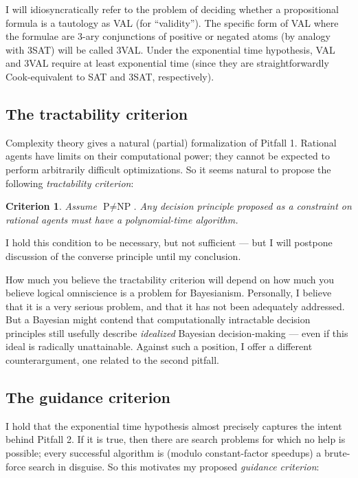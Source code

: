 \documentclass[letterpaper,12pt]{article}
\newtheorem{tractability}{Criterion}[section]
\begin{document}
I will idiosyncratically refer to the problem of deciding whether a propositional formula is a tautology as VAL (for ``validity''). The specific form of VAL where the formulae are 3-ary conjunctions of positive or negated atoms (by analogy with 3SAT) will be called 3VAL. Under the exponential time hypothesis, VAL and 3VAL require at least exponential time (since they are straightforwardly Cook-equivalent to SAT and 3SAT, respectively).

\subsection{The tractability criterion}
Complexity theory gives a natural (partial) formalization of Pitfall 1. Rational agents have limits on their computational power; they cannot be expected to perform arbitrarily difficult optimizations. So it seems natural to propose the following \emph{tractability criterion}:

\begin{tractability}
Assume $\text{P} \not = \text{NP}$. Any decision principle proposed as a constraint on rational agents must have a polynomial-time algorithm.
\end{tractability}

I hold this condition to be necessary, but not sufficient --- but I will postpone discussion of the converse principle until my conclusion.

How much you believe the tractability criterion will depend on how much you believe logical omniscience is a problem for Bayesianism. Personally, I believe that it is a very serious problem, and that it has not been adequately addressed. But a Bayesian might contend that computationally intractable decision principles still usefully describe \emph{idealized} Bayesian decision-making --- even if this ideal is radically unattainable. Against such a position, I offer a different counterargument, one related to the second pitfall. 

\subsection{The guidance criterion}
I hold that the exponential time hypothesis almost precisely captures the intent behind Pitfall 2. If it is true, then there are search problems for which no help is possible; every successful algorithm is (modulo constant-factor speedups) a brute-force search in disguise. So this motivates my proposed \emph{guidance criterion}:
\end{document}
